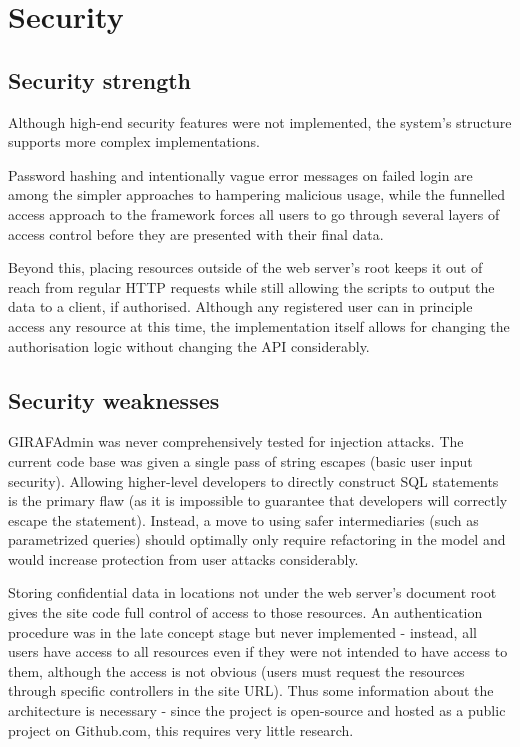 \section{Security}


\subsection{Security strength }
Although high-end security features were not implemented, the system's structure supports more complex implementations.

Password hashing and intentionally vague error messages on failed login are among the simpler approaches to hampering malicious usage, while the funnelled access approach to the framework forces all users to go through several layers of access control before they are presented with their final data.

Beyond this, placing resources outside of the web server's root keeps it out of reach from regular HTTP requests while still allowing the scripts to output the data to a client, if authorised. Although any registered user can in principle access any resource at this time, the implementation itself allows for changing the authorisation logic without changing the API considerably.

\subsection{Security weaknesses}
GIRAFAdmin was never comprehensively tested for injection attacks. The current code base was given a single pass of string escapes (basic user input security). Allowing higher-level developers to directly construct SQL statements is the primary flaw (as it is impossible to guarantee that developers will correctly escape the statement). Instead, a move to using safer intermediaries (such as parametrized queries) should optimally only require refactoring in the model and would increase protection from user attacks considerably. 

Storing confidential data in locations not under the web server's document root gives the site code full control of access to those resources. An authentication procedure was in the late concept stage but never implemented - instead, all users have access to all resources even if they were not intended to have access to them, although the access is not obvious (users must request the resources through specific controllers in the site URL). Thus some information about the architecture is necessary - since the project is open-source and hosted as a public project on Github.com, this requires very little research. 


